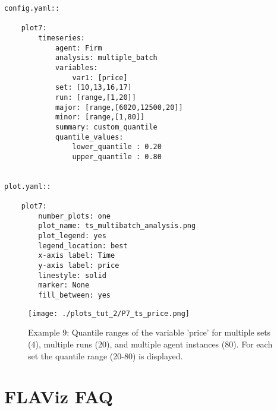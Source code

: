 \documentclass[10pt,a4paper]{article}
\begin{document}
\begin{lstlisting}
config.yaml::

    plot7:
        timeseries:
            agent: Firm
            analysis: multiple_batch
            variables:
                var1: [price]
            set: [10,13,16,17]
            run: [range,[1,20]]
            major: [range,[6020,12500,20]]
            minor: [range,[1,80]] 
            summary: custom_quantile
            quantile_values:          
                lower_quantile : 0.20
                upper_quantile : 0.80


plot.yaml::

    plot7:
        number_plots: one
        plot_name: ts_multibatch_analysis.png
        plot_legend: yes
        legend_location: best
        x-axis label: Time
        y-axis label: price
        linestyle: solid
        marker: None
        fill_between: yes
\end{lstlisting}

\begin{figure}[b!]\centering\leavevmode
\texttt{[image: ./plots\_tut\_2/P7\_ts\_price.png]}
\caption{\footnotesize  Example 9: Quantile ranges of the variable 'price' for multiple sets (4), multiple runs (20), and multiple agent instances (80). For each set the quantile range (20-80) is displayed.}
\end{figure}


\section{FLAViz FAQ}
\end{document}
